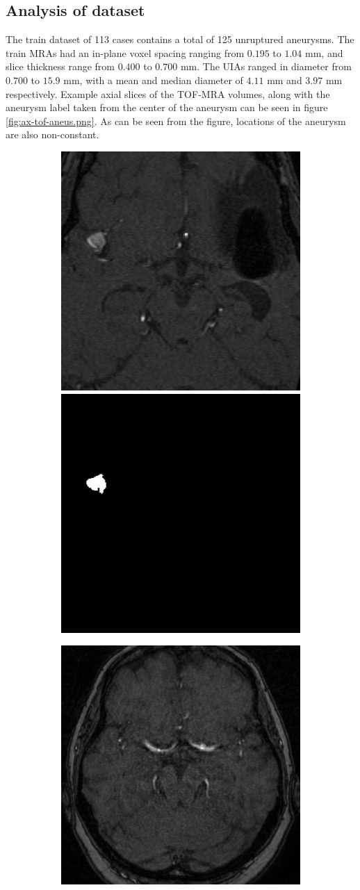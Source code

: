 \subsection{Analysis of dataset}
The train dataset of 113 cases contains a total of 125 unruptured aneurysms. The train MRAs had an in-plane voxel spacing ranging from $0.195$ to $1.04$ mm, and slice thickness range from $0.400$ to $0.700$ mm. The UIAs ranged in diameter from $0.700$ to $15.9$ mm, with a mean and median diameter of $4.11$ mm and $3.97$ mm respectively. Example axial slices of the TOF-MRA volumes, along with the aneurysm label taken from the center of the aneurysm can be seen in figure \ref{fig:ax-tof-aneus.png}. As can be seen from the figure, locations of the aneurysm are also non-constant.

\begin{figure}
	\centering
	\begin{subfigure}{0.9\linewidth}
		\includegraphics[width=0.5\linewidth]{figures/tof-aneu-max.png}
		\includegraphics[width=0.5\linewidth]{figures/aneu-max.png}
	\end{subfigure}
	\begin{subfigure}{0.9\linewidth}
		\includegraphics[width=0.5\linewidth]{figures/tof-aneu-min.png}

\end{subfigure}
\end{figure}

